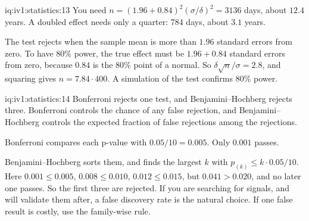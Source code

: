 \begin{solution}{iq:iv1:statistics:13}
You need $n = (1.96 + 0.84)^2(\sigma/\delta)^2 = 3136$ days, about $12.4$ years. A doubled effect needs only a quarter: 784 days, about $3.1$ years.

The test rejects when the sample mean is more than $1.96$ standard errors from zero. To have 80\% power, the true effect must be $1.96 + 0.84$ standard errors from zero, because $0.84$ is the 80\% point of a normal. So $\delta\sqrt{n}/\sigma = 2.8$, and squaring gives $n = 7.84 \cdot 400$. A simulation of the test confirms 80\% power.

\end{solution}

\begin{solution}{iq:iv1:statistics:14}
Bonferroni rejects one test, and Benjamini--Hochberg rejects three. Bonferroni controls the chance of any false rejection, and Benjamini--Hochberg controls the expected fraction of false rejections among the rejections.

Bonferroni compares each p-value with $0.05/10 = 0.005$. Only $0.001$ passes.

Benjamini--Hochberg sorts them, and finds the largest $k$ with $p_{(k)} \le k \cdot 0.05/10$. Here $0.001 \le 0.005$, $0.008 \le 0.010$, $0.012 \le 0.015$, but $0.041 > 0.020$, and no later one passes. So the first three are rejected. If you are searching for signals, and will validate them after, a false discovery rate is the natural choice. If one false result is costly, use the family-wise rule.

\end{solution}

